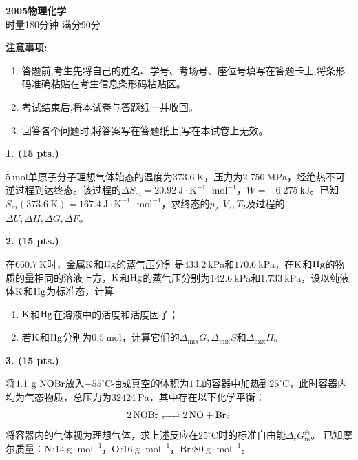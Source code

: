 \begin{center}
    {\LARGE \textbf{2005物理化学}} \\[2ex]
    {\large 时量180分钟 \quad 满分90分}
\end{center}

\vspace{0.5cm}
\noindent\textbf{注意事项:}
\begin{enumerate}[label=\arabic*., parsep=0pt, itemsep=0pt]
    \item 答题前,考生先将自己的姓名、学号、考场号、座位号填写在答题卡上,将条形码准确粘贴在考生信息条形码粘贴区。
    \item 考试结束后,将本试卷与答题纸一并收回。
    \item 回答各个问题时,将答案写在答题纸上,写在本试卷上无效。
\end{enumerate}

\vspace{0.5cm}
\noindent\textbf{1. (15 pts.)}

$5\ \mathrm{mol}$单原子分子理想气体始态的温度为$373.6\ \mathrm{K}$，压力为$2.750\ \mathrm{MPa}$，经绝热不可逆过程到达终态。该过程的$\Delta S_m = 20.92\ \mathrm{J\cdot K^{-1}\cdot mol^{-1}}$，$W = -6.275\ \mathrm{kJ}$。已知$S_m(373.6\ \mathrm{K}) = 167.4\ \mathrm{J\cdot K^{-1}\cdot mol^{-1}}$，求终态的$p_2,V_2,T_2$及过程的$\Delta U,\Delta H,\Delta G,\Delta F$。

\vspace{0.5cm}
\noindent\textbf{2. (15 pts.)}

在$660.7\ \mathrm{K}$时，金属$\ce{K}$和$\ce{Hg}$的蒸气压分别是$433.2\ \mathrm{kPa}$和$170.6\ \mathrm{kPa}$，在$\ce{K}$和$\ce{Hg}$的物质的量相同的溶液上方，$\ce{K}$和$\ce{Hg}$的蒸气压分别为$142.6\ \mathrm{kPa}$和$1.733\ \mathrm{kPa}$，设以纯液体$\ce{K}$和$\ce{Hg}$为标准态，计算
\begin{enumerate}[label=(\arabic*), itemsep=1ex]
    \item $\ce{K}$和$\ce{Hg}$在溶液中的活度和活度因子；
    \item 若$\ce{K}$和$\ce{Hg}$分别为$0.5\ \mathrm{mol}$，计算它们的$\Delta_\mathrm{mix}G,\Delta_\mathrm{mix}S$和$\Delta_\mathrm{mix}H$。
\end{enumerate}

\vspace{0.5cm}
\noindent\textbf{3. (15 pts.)}

将$1.1\ \mathrm{g}\ \ce{NOBr}$放入$-55^\circ\mathrm{C}$抽成真空的体积为$1\ \mathrm{L}$的容器中加热到$25^\circ\mathrm{C}$，此时容器内均为气态物质，总压力为$32424\ \mathrm{Pa}$，其中存在以下化学平衡：
\[
\ce{2NOBr <=> 2NO + Br_2}
\]
将容器内的气体视为理想气体，求上述反应在$25^\circ\mathrm{C}$时的标准自由能$\Delta_\mathrm{r}G_\mathrm{m}^\ominus$。
已知摩尔质量：$\ce{N}$:$14\ \mathrm{g\cdot mol^{-1}}$，$\ce{O}$:$16\ \mathrm{g\cdot mol^{-1}}$，$\ce{Br}$:$80\ \mathrm{g\cdot mol^{-1}}$。

